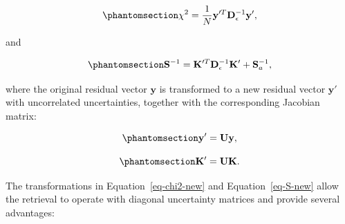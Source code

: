\documentclass[
  11pt,
  letterpaper,
]{scrreprt}
\begin{document}
\begin{equation}\phantomsection\label{eq-chi2-new}{
\chi^2
=
\frac{1}{N}
\mathbf{y}'^{T}
\mathbf{D}_{\epsilon}^{-1}
\mathbf{y}',
}\end{equation}

and

\begin{equation}\phantomsection\label{eq-S-new}{
\mathbf{S}^{-1}
=
\mathbf{K}'^{T}
\mathbf{D}_{\epsilon}^{-1}
\mathbf{K}'
+
\mathbf{S}_{a}^{-1},
}\end{equation}

where the original residual vector \(\mathbf{y}\) is transformed to a
new residual vector \(\mathbf{y}'\) with uncorrelated uncertainties,
together with the corresponding Jacobian matrix:

\begin{equation}\phantomsection\label{eq-y-transform}{
\mathbf{y}'
=
\mathbf{U}\mathbf{y},
}\end{equation}

\begin{equation}\phantomsection\label{eq-K-transform}{
\mathbf{K}'
=
\mathbf{U}\mathbf{K}.
}\end{equation}

The transformations in Equation~\ref{eq-chi2-new} and
Equation~\ref{eq-S-new} allow the retrieval to operate with diagonal
uncertainty matrices and provide several advantages:
\end{document}
